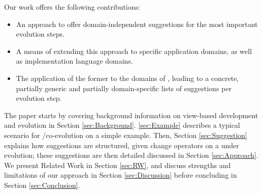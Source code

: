 Our work offers the following contributions:
\begin{itemize}
    \item An approach to offer domain-independent suggestions for the most important \metamodel evolution steps.
    \item A means of extending this approach to specific application domains, 
		as well as implementation language domains. 
    \item The application of the former to the domains of , leading to a concrete, partially generic and partially domain-specific lists of suggestions per \metamodel evolution step.
\end{itemize}

The paper starts by covering background information on view-based development and
\metamodel evolution in Section \ref{sec:Background}. \autoref{sec:Example} describes
a typical scenario for \metamodel/\viewtype co-evolution on a simple example. Then,
Section \ref{sec:Suggestion} explains how \viewtype suggestions are structured, given
change operators on a \metamodel under evolution; these suggestions are then 
detailed discussed in Section \ref{sec:Approach}. We present Related Work in 
Section \ref{sec:RW}, and discuss strengths and limitations of our approach in 
Section \ref{sec:Discussion} before concluding in Section \ref{sec:Conclusion}.